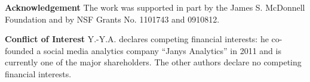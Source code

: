 \documentclass[letterpaper]{article}
\begin{document}
\noindent \textbf{Acknowledgement} 
The work was supported in part by the James S. McDonnell Foundation and by NSF Grants No. 1101743 and 0910812.

\noindent \textbf{Conflict of Interest}
Y.-Y.A. declares competing financial interests: he co-founded a social media analytics company ``Janys Analytics'' in 2011 and is currently one of the major shareholders. The other authors declare no competing financial interests.




\end{document}
